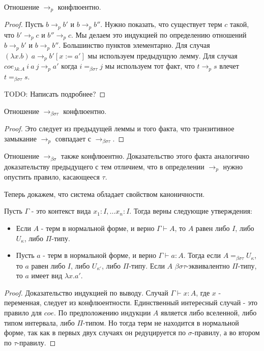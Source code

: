 \documentclass{amsart}
\theoremstyle{definition}
\theoremstyle{remark}
\newcommand{\bs}{\beta\sigma}
\newcommand{\rbs}{\to_{\bs}}
\newcommand{\bst}{\bs\tau}
\newcommand{\ebst}{=_{\bst}}
\newcommand{\rbst}{\to_{\bst}}
\numberwithin{figure}{section}
\begin{document}
\begin{lem}
Отношение $\to_p$ конфлюентно.
\end{lem}
\begin{proof}
Пусть $b \to_p b'$ и $b \to_p b''$.
Нужно показать, что существует терм $c$ такой, что $b' \to_p c$ и $b'' \to_p c$.
Мы делаем это индукцией по определению отношений $b \to_p b'$ и $b \to_p b''$.
Большинство пунктов элементарно.
Для случая $(\lambda x. b)\ a \to_p b'[x := a']$ мы используем предыдущую лемму.
Для случая $coe_{\lambda k. A}\ i\ a\ j \to_p a'$ когда $i \ebst j$ мы используем тот факт, что $t \to_p s$ влечет $t \ebst s$.

TODO: Написать подробнее?
\end{proof}

\begin{prop}
Отношение $\rbst$ конфлюентно.
\end{prop}
\begin{proof}
Это следует из предыдущей леммы и того факта, что транзитивное замыкание $\to_p$ совпадает с $\rbst$.
\end{proof}

\begin{remark}
Отношение $\rbs$ также конфлюентно.
Доказательство этого факта аналогично доказательству предыдущего с тем отличием, что в определении $\to_p$ нужно опустить правило, касающееся $\tau$.
\end{remark}

Теперь докажем, что система обладает свойством каноничности.

\begin{prop}
Пусть $\Gamma$ - это контекст вида $x_1 : I, \ldots x_n : I$.
Тогда верны следующие утверждения:
\begin{itemize}
\item Если $A$ - терм в нормальной форме, и верно $\Gamma \vdash A$, то $A$ равен либо $I$, либо $U_\kappa$, либо $\Pi$-типу.
\item Пусть $a$ - терм в нормальной форме, и верно $\Gamma \vdash a : A$.
    Тогда если $A \ebst U_\kappa$, то $a$ равен либо $I$, либо $U_{\kappa'}$, либо $\Pi$-типу.
    Если $A$ $\bst$-эквивалентно $\Pi$-типу, то $a$ имеет вид $\lambda x. a'$.
\end{itemize}
\end{prop}
\begin{proof}
Доказательство индукцией по выводу.
Случай $\Gamma \vdash x : A$, где $x$ - переменная, следует из конфлюентности.
Единственный интересный случай - это правило для $coe$.
По предположению индукции $A$ является либо вселенной, либо типом интервала, либо $\Pi$-типом.
Но тогда терм не находится в нормальной форме, так как в первых двух случаях он редуцируется по $\sigma$-правилу, а во втором по $\tau$-правилу.
\end{proof}
\end{document}
